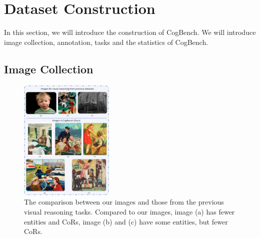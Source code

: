 \section{Dataset Construction}





In this section, we will introduce the construction of CogBench. 
We will introduce image collection, annotation, tasks and the statistics of CogBench.


\subsection{Image Collection}

\begin{figure}[htbp]

\centering
    \centering
    \includegraphics[width=0.4\textwidth]{figs/cog_img_example2.pdf}
    \caption{The comparison between our images and those from the previous visual reasoning tasks.
    Compared to our images, image (a) has fewer entities and CoRs, image (b) and (c) have some entities, but fewer CoRs.
    }
    \label{fig:cogbench_example}

\end{figure}






